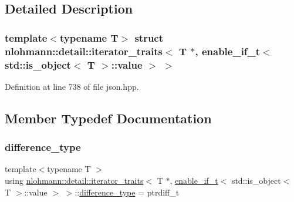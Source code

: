 \subsection{Detailed Description}
\subsubsection*{template$<$typename T$>$\newline
struct nlohmann\+::detail\+::iterator\+\_\+traits$<$ T $\ast$, enable\+\_\+if\+\_\+t$<$ std\+::is\+\_\+object$<$ T $>$\+::value $>$ $>$}



Definition at line 738 of file json.\+hpp.



\subsection{Member Typedef Documentation}
\mbox{\label{structnlohmann_1_1detail_1_1iterator__traits_3_01_t_01_5_00_01enable__if__t_3_01std_1_1is__objec8d960665487688165530972cda4f1bea_ae7be99eb434f5b5f34692874c272b759}} 
\subsubsection{\texorpdfstring{difference\_type}{difference\_type}}
{\footnotesize\ttfamily template$<$typename T $>$ \\
using \mbox{\hyperlink{structnlohmann_1_1detail_1_1iterator__traits}{nlohmann\+::detail\+::iterator\+\_\+traits}}$<$ T $\ast$, \mbox{\hyperlink{namespacenlohmann_1_1detail_a02bcbc878bee413f25b985ada771aa9c}{enable\+\_\+if\+\_\+t}}$<$ std\+::is\+\_\+object$<$ T $>$\+::value $>$ $>$\+::\mbox{\hyperlink{structnlohmann_1_1detail_1_1iterator__traits_3_01_t_01_5_00_01enable__if__t_3_01std_1_1is__objec8d960665487688165530972cda4f1bea_ae7be99eb434f5b5f34692874c272b759}{difference\+\_\+type}} =  ptrdiff\+\_\+t}




